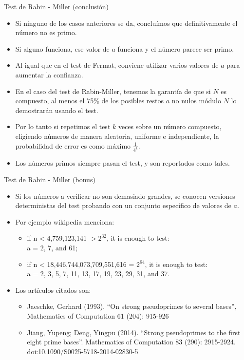 \documentclass{beamer}
\begin{document}
\begin{frame}{Test de Rabin - Miller (conclusión)}
    \begin{itemize}
      \item Si ninguno de los casos anteriores se da, concluímos que definitivamente el número no es primo.
      \item Si alguno funciona, ese valor de $a$ funciona y el número parece ser primo.
      \item Al igual que en el test de Fermat, conviene utilizar varios valores de $a$ para aumentar la confianza.
      \item En el caso del test de Rabin-Miller, tenemos la garantía de que si $N$ es compuesto, al menos el 75\% de los posibles restos $a$ no nulos módulo $N$ lo demostrarán usando el test.
      \item Por lo tanto si repetimos el test $k$ veces sobre un número compuesto, eligiendo números de manera aleatoria, uniforme e independiente, la probabilidad de error es como máximo $\frac{1}{4^k}$.
      \item Los números primos siempre pasan el test, y son reportados como tales.
  \end{itemize}
\end{frame}

\begin{frame}{Test de Rabin - Miller (bonus)}
    \begin{itemize}
      \item Si los números a verificar no son demasiado grandes, se conocen versiones deterministas del test probando con un conjunto específico de valores de $a$.
      \item Por ejemplo wikipedia menciona:
        \begin{itemize}
          \item if n < 4,759,123,141 $>2^{32}$, it is enough to test: \\ a = 2, 7, and 61;
          \item if n < 18,446,744,073,709,551,616 = $2^{64}$, it is enough to test: \\a = 2, 3, 5, 7, 11, 13, 17, 19, 23, 29, 31, and 37.
        \end{itemize}
      \item Los artículos citados son:
        \begin{itemize}
          \item Jaeschke, Gerhard (1993), ``On strong pseudoprimes to several bases'', Mathematics of Computation 61 (204): 915-926
          \item Jiang, Yupeng; Deng, Yingpu (2014). ``Strong pseudoprimes to the first eight prime bases''. Mathematics of Computation 83 (290): 2915-2924. doi:10.1090/S0025-5718-2014-02830-5
        \end{itemize}
  \end{itemize}
\end{frame}
\end{document}
